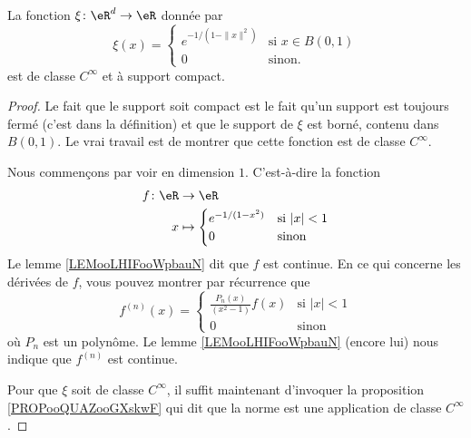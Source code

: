 \begin{proposition}     \label{PROPooAHLKooMFMgFq}
	La fonction \( \xi\colon \eR^d\to \eR\) donnée par
	\begin{equation}    \label{EqOBYNEMu}
		\xi(x)=\begin{cases}
			e^{-1/(1-\| x \|^2)} & \text{si } x\in B(0,1) \\
			0                    & \text{sinon}.
		\end{cases}
	\end{equation}
	est de classe \( C^{\infty}\) et à support compact.
\end{proposition}

\begin{proof}
	Le fait que le support soit compact est le fait qu'un support est toujours fermé (c'est dans la définition) et que le support de \( \xi\) est borné, contenu dans \( B(0,1)\). Le vrai travail est de montrer que cette fonction est de classe \(  C^{\infty}\).

	Nous commençons par voir en dimension \( 1\). C'est-à-dire la fonction
	\begin{equation}
		\begin{aligned}
			f\colon \eR & \to \eR                                     \\
			x           & \mapsto \begin{cases}
				                      e^{-1/(1-x^2)} & \text{si } | x |<1 \\
				                      0              & \text{sinon }
			                      \end{cases}
		\end{aligned}
	\end{equation}
	Le lemme \ref{LEMooLHIFooWpbauN} dit que \( f\) est continue. En ce qui concerne les dérivées de \( f\), vous pouvez montrer par récurrence que
	\begin{equation}
		f^{(n)}(x)=\begin{cases}
			\frac{ P_n(x) }{ (x^2-1) }f(x) & \text{si } | x |<1 \\
			0                              & \text{sinon }
		\end{cases}
	\end{equation}
	où \( P_n\) est un polynôme. Le lemme \ref{LEMooLHIFooWpbauN} (encore lui) nous indique que \( f^{(n)}\) est continue.

	Pour que \( \xi\) soit de classe \(  C^{\infty}\), il suffit maintenant d'invoquer la proposition \ref{PROPooQUAZooGXskwF} qui dit que la norme est une application de classe \(  C^{\infty}\).
\end{proof}

